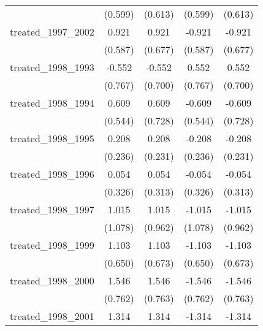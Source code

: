 {\begin{tabular}{l*{4}{c}}
            &     (0.599)         &     (0.613)         &     (0.599)         &     (0.613)         \\
[1em]
treated\_1997\_2002&       0.921         &       0.921         &      -0.921         &      -0.921         \\
            &     (0.587)         &     (0.677)         &     (0.587)         &     (0.677)         \\
[1em]
treated\_1998\_1993&      -0.552         &      -0.552         &       0.552         &       0.552         \\
            &     (0.767)         &     (0.700)         &     (0.767)         &     (0.700)         \\
[1em]
treated\_1998\_1994&       0.609         &       0.609         &      -0.609         &      -0.609         \\
            &     (0.544)         &     (0.728)         &     (0.544)         &     (0.728)         \\
[1em]
treated\_1998\_1995&       0.208         &       0.208         &      -0.208         &      -0.208         \\
            &     (0.236)         &     (0.231)         &     (0.236)         &     (0.231)         \\
[1em]
treated\_1998\_1996&       0.054         &       0.054         &      -0.054         &      -0.054         \\
            &     (0.326)         &     (0.313)         &     (0.326)         &     (0.313)         \\
[1em]
treated\_1998\_1997&       1.015         &       1.015         &      -1.015         &      -1.015         \\
            &     (1.078)         &     (0.962)         &     (1.078)         &     (0.962)         \\
[1em]
treated\_1998\_1999&       1.103         &       1.103         &      -1.103         &      -1.103         \\
            &     (0.650)         &     (0.673)         &     (0.650)         &     (0.673)         \\
[1em]
treated\_1998\_2000&       1.546\sym{*}  &       1.546\sym{*}  &      -1.546\sym{*}  &      -1.546\sym{*}  \\
            &     (0.762)         &     (0.763)         &     (0.762)         &     (0.763)         \\
[1em]
treated\_1998\_2001&       1.314\sym{**} &       1.314\sym{***}&      -1.314\sym{**} &      -1.314\sym{***}\\

\end{tabular}}
